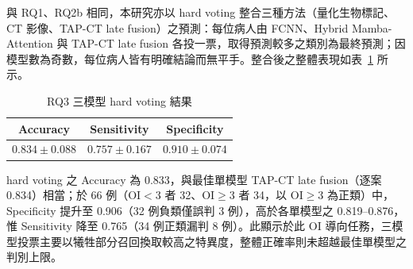 \begin{ZhChapter}
與 RQ1、RQ2b 相同，本研究亦以 hard voting 整合三種方法（量化生物標記、CT 影像、TAP-CT late fusion）之預測：每位病人由 FCNN、Hybrid Mamba-Attention 與 TAP-CT late fusion 各投一票，取得預測較多之類別為最終預測；因模型數為奇數，每位病人皆有明確結論而無平手。整合後之整體表現如表~\ref{tab:rq3_vote} 所示。

\begin{table}[htbp]
\centering
\caption{RQ3 三模型 hard voting 結果}
\label{tab:rq3_vote}
\begingroup
\renewcommand{\arraystretch}{1.25}
\begin{tabular}{ccc}
\hline
Accuracy & Sensitivity & Specificity \\
\hline
\(0.834 \pm 0.088\) & \(0.757 \pm 0.167\) & \(0.910 \pm 0.074\) \\
\hline
\end{tabular}
\endgroup
\end{table}

hard voting 之 Accuracy 為 0.833，與最佳單模型 TAP-CT late fusion（逐案 0.834）相當；於 66 例（OI$<3$ 者 32、OI$\geq 3$ 者 34，以 OI$\geq 3$ 為正類）中，Specificity 提升至 0.906（32 例負類僅誤判 3 例），高於各單模型之 0.819--0.876，惟 Sensitivity 降至 0.765（34 例正類漏判 8 例）。此顯示於此 OI 導向任務，三模型投票主要以犧牲部分召回換取較高之特異度，整體正確率則未超越最佳單模型之判別上限。

\FloatBarrier

\end{ZhChapter}
